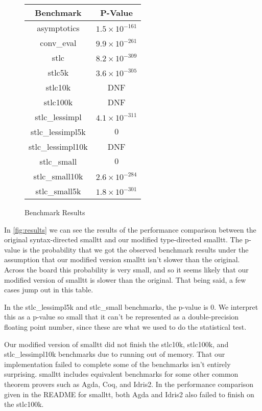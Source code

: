 \documentclass[sigplan,nonacm]{acmart}
\begin{document}
\begin{figure}[!htb]
  \centering
  \begin{tabular}{|c | c|}
    \hline
    Benchmark & P-Value
    \\ \hline
    asymptotics & $1.5 \times 10^{-161}$
    \\ \hline
    conv\_eval & $9.9 \times 10^{-261}$
    \\ \hline
    stlc & $8.2 \times 10^{-309}$
    \\ \hline
    stlc5k & $3.6 \times 10^{-305}$
    \\ \hline
    stlc10k & DNF
    \\ \hline
    stlc100k & DNF
    \\ \hline
    stlc\_lessimpl & $4.1 \times 10^{-311}$
    \\ \hline
    stlc\_lessimpl5k & $0$
    \\ \hline
    stlc\_lessimpl10k & DNF
    \\ \hline
    stlc\_small & $0$
    \\ \hline
    stlc\_small10k & $2.6 \times 10^{-284}$
    \\ \hline
    stlc\_small5k & $1.8 \times 10^{-301}$
    \\ \hline
  \end{tabular}
  \caption{Benchmark Results}
  \label{fig:results}
\end{figure}

In \autoref{fig:results} we can see the results of the performance comparison between the original syntax-directed smalltt and our modified type-directed smalltt.
The p-value is the probability that we got the observed benchmark results under the assumption that our modified version smalltt isn't slower than the original.
Across the board this probability is very small, and so it seems likely that our modified version of smalltt is slower than the original.
That being said, a few cases jump out in this table.

In the stlc\_lessimpl5k and stlc\_small benchmarks, the p-value is 0.
We interpret this as a p-value so small that it can't be represented as a double-precision floating point number, since these are what we used to do the statistical test.

Our modified version of smalltt did not finish the stlc10k, stlc100k, and stlc\_lessimpl10k benchmarks due to running out of memory.
That our implementation failed to complete some of the benchmarks isn't entirely surprising.
smalltt includes equivalent benchmarks for some other common theorem provers such as Agda, Coq, and Idris2.
In the performance comparison given in the README for smalltt, both Agda and Idris2 also failed to finish on the stlc100k.
\end{document}
